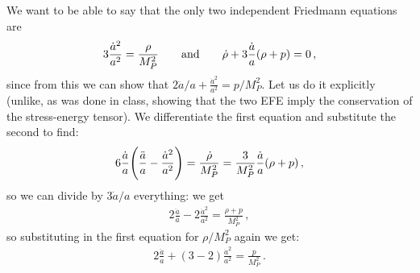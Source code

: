 \documentclass[main.tex]{subfiles}
\begin{document}
We want to be able to say that the only two independent Friedmann equations are 
%
\begin{align}
3\frac{\dot{a}^2}{a^2} = \frac{\rho }{M_P^2}
\qquad \text{and} \qquad
\dot{\rho} + 3 \frac{\dot{a}}{a} \qty(\rho + p) = 0
\,,
\end{align}
%
since from this we can show that \(2 \ddot{a} / a + \frac{\dot{a}^2}{a^2} = p / M_P^2\). Let us do it explicitly (unlike, as was done in class, showing that the two EFE imply the conservation of the stress-energy tensor). We differentiate the first equation and substitute the second to find: 
%
\begin{align}
6 \frac{\dot{a}}{a} \qty(\frac{\ddot{a}}{a } - \frac{\dot{a}^2}{a^2}) = \frac{\dot{\rho}}{M_P^2}
= \frac{3}{M_P^2} \frac{\dot{a}}{a} \qty(\rho +p)
\,,
\end{align}
%
so we can divide by \(3 \dot{a} / a\) everything: we get 
%
\begin{align}
2 \frac{\ddot{a}}{a} - 2 \frac{\dot{a}^2}{a^2} = \frac{\rho +p}{M_P^2} 
\,,
\end{align}
%
so substituting in the first equation for \(\rho / M_P^2\) again we get: 
%
\begin{align}
2 \frac{\ddot{a}}{a} + (3-2) \frac{\dot{a}^2}{a^2} = \frac{p}{M_P^2}
\,.
\end{align}
\end{document}
